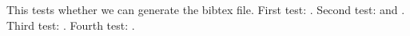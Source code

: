 \documentclass{article}
\begin{document}
This tests whether we can generate the bibtex file.
First test: \cite{bib:dcicpp}.
Second test: \cite{bib:gotoblas} and \cite{bib:lancelot}.
Third test: \cite{bib:book-nocedal,bib:steihaug, bib:hs}.
Fourth test: \cite{bib:dcicpp,bib:gotoblas}.



\end{document}
